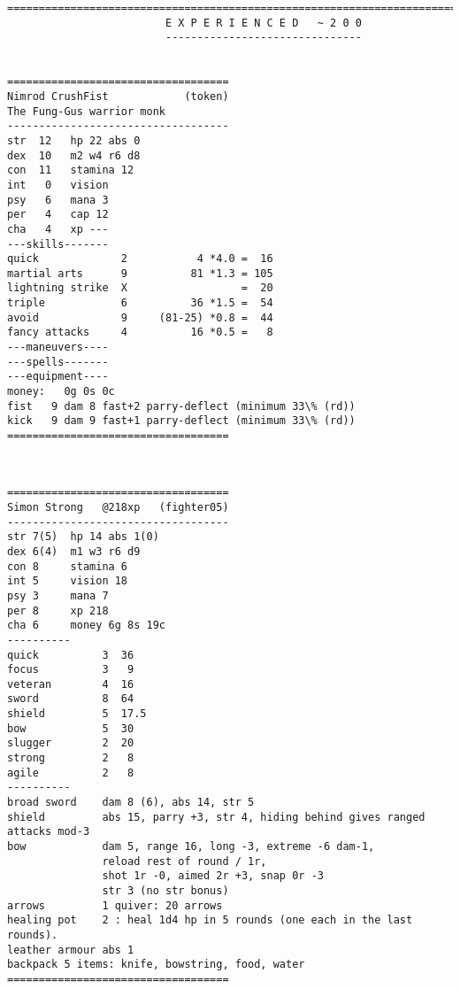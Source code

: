 \clearpage

\goodbreak
\tiny \begin{samepage} \begin{verbatim}
================================================================================
                         E X P E R I E N C E D   ~ 2 0 0
                         -------------------------------


===================================
Nimrod CrushFist            (token)
The Fung-Gus warrior monk
-----------------------------------
str  12   hp 22 abs 0
dex  10   m2 w4 r6 d8
con  11   stamina 12
int   0   vision
psy   6   mana 3
per   4   cap 12
cha   4   xp ---
---skills-------
quick             2           4 *4.0 =  16
martial arts      9          81 *1.3 = 105
lightning strike  X                  =  20
triple            6          36 *1.5 =  54
avoid             9     (81-25) *0.8 =  44
fancy attacks     4          16 *0.5 =   8
---maneuvers----
---spells-------
---equipment----
money:   0g 0s 0c
fist   9 dam 8 fast+2 parry-deflect (minimum 33\% (rd))
kick   9 dam 9 fast+1 parry-deflect (minimum 33\% (rd))
===================================
\end{verbatim} \end{samepage} \normalsize


\


\goodbreak
\tiny \begin{samepage} \begin{verbatim}
===================================
Simon Strong   @218xp   (fighter05)
-----------------------------------
str 7(5)  hp 14 abs 1(0)
dex 6(4)  m1 w3 r6 d9
con 8     stamina 6
int 5     vision 18
psy 3     mana 7
per 8     xp 218
cha 6     money 6g 8s 19c
----------
quick          3  36
focus          3   9
veteran        4  16
sword          8  64
shield         5  17.5
bow            5  30
slugger        2  20
strong         2   8
agile          2   8
----------
broad sword    dam 8 (6), abs 14, str 5
shield         abs 15, parry +3, str 4, hiding behind gives ranged attacks mod-3
bow            dam 5, range 16, long -3, extreme -6 dam-1,
               reload rest of round / 1r,
               shot 1r -0, aimed 2r +3, snap 0r -3
               str 3 (no str bonus)
arrows         1 quiver: 20 arrows
healing pot    2 : heal 1d4 hp in 5 rounds (one each in the last rounds).
leather armour abs 1
backpack 5 items: knife, bowstring, food, water
===================================
\end{verbatim} \end{samepage} \normalsize


